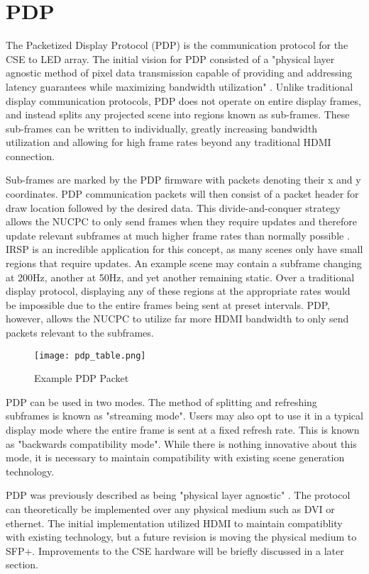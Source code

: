 \section{PDP}
The Packetized Display Protocol (PDP) is the communication protocol for the CSE to LED array. The initial vision for PDP consisted of a "physical layer agnostic method of pixel data transmission capable of providing and addressing latency guarantees while maximizing bandwidth utilization" \cite{pdp_ieee}. Unlike traditional display communication protocols, PDP does not operate on entire display frames, and instead splits any projected scene into regions known as sub-frames. These sub-frames can be written to individually, greatly increasing bandwidth utilization and allowing for high frame rates beyond any traditional HDMI connection. \par
Sub-frames are marked by the PDP firmware with packets denoting their x and y coordinates. PDP communication packets will then consist of a packet header for draw location followed by the desired data. This divide-and-conquer strategy allows the NUCPC to only send frames when they require updates and therefore update relevant subframes at much higher frame rates than normally possible \cite{chris}. IRSP is an incredible application for this concept, as many scenes only have small regions that require updates. An example scene may contain a subframe changing at 200Hz, another at 50Hz, and yet another remaining static. Over a traditional display protocol, displaying any of these regions at the appropriate rates would be impossible due to the entire frames being sent at preset intervals. PDP, however, allows the NUCPC to utilize far more HDMI bandwidth to only send packets relevant to the subframes.\par
\begin{figure}[!htb]
	\texttt{[image: pdp\_table.png]}
	\centering
	\caption{Example PDP Packet \cite{chris}}
	\centering
\end{figure}
PDP can be used in two modes. The method of splitting and refreshing subframes is known as "streaming mode". Users may also opt to use it in a typical display mode where the entire frame is sent at a fixed refresh rate. This is known as "backwards compatibility mode". While there is nothing innovative about this mode, it is necessary to maintain compatibility with existing scene generation technology.\par
PDP was previously described as being "physical layer agnostic" \cite{pdp_ieee}. The protocol can theoretically be implemented over any physical medium such as DVI or ethernet. The initial implementation utilized HDMI to maintain compatiblity with existing technology, but a future revision is moving the physical medium to SFP+. Improvements to the CSE hardware will be briefly discussed in a later section.